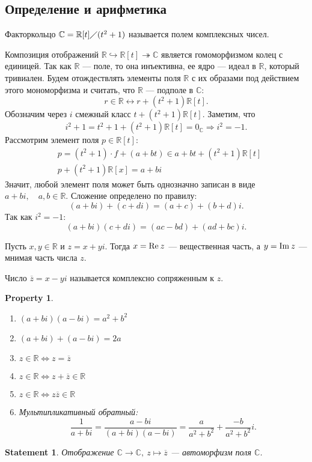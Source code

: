\documentclass[11pt]{book}
\newcommand{\R}{\mathbb{R}}
\newcommand{\Cm}{\mathbb{C}}
\newcommand{\po}{\diagup}
\newcommand{\re}{{\mathop{\text{\rm Re}}\:}}
\newcommand{\im}{{\mathop{\text{\rm Im}}}\:}
\theoremstyle{definition}
\theoremstyle{plain}
\theoremstyle{plain}
\newtheorem{st}{Statement}
\newtheorem*{prop}{Property}
\theoremstyle{definition}
\theoremstyle{remark}
\begin{document}
\subsection{Определение и арифметика}
\begin{defn}
    Факторкольцо $ \Cm = \R[t] \po (t^2+1)$ называется {\sf полем комплексных чисел}.
\end{defn}
Композиция отображений $ \R \hookrightarrow \R[t] \twoheadrightarrow \Cm$ является гомоморфизмом колец с единицей.
Так как $ \R$ --- поле, то она инъективна, ее ядро --- идеал в  $ \R$, который тривиален.
Будем отождествлять элементы поля $ \R$ с их образами под действием этого мономорфизма и считать, что  $ \R$ --- подполе  в $ \Cm$:
\[
    r \in \R \longleftrightarrow r + (t^2+1) \R[t]
.\]
Обозначим через $ i$ смежный класс  $ t + (t^2+1)\R[t]$. Заметим, что
\[
    i^2+1 = t^2+1 + (t^2+1)\R[t] = 0_{\Cm} \Longrightarrow i^2 = -1
.\]
Рассмотрим элемент поля $ p \in \R[t]$:
\begin{align*}
    &p = (t^2+1) \cdot f + (a+bt) \in a + bt + (t^2+1) \R[t] \\
    &p + (t^2+1) \R[x] = a + bi
\end{align*}
Значит, любой элемент поля может быть однозначно записан в виде $ a + bi, \quad a, b \in \R$.
Сложение определено по правилу:
$$
(a+bi)+(c+di) = (a+c) + (b+d) i
.$$
Так как $ i^2 = -1$:
\[
    (a+bi)(c + di) = (ac -bd)+(ad + bc)i
.\]
\begin{defn}
    Пусть $ x, y \in \R$ и $ z = x + yi$.
    Тогда  $ x = \re z$ ---  {\sf вещественная часть}, а $ y = \im z$ --- {\sf мнимая часть} числа  $ z$.

    Число $\overline{z}= x - yi $ называется {\sf комплексно сопряженным} к $ z$.
\end{defn}
\begin{prop}
    $ $
    \begin{enumerate}[noitemsep]
	\item $ (a+bi) (a-bi) = a^2  + b^2$
	\item $ (a+bi)+(a-bi) = 2a$
	\item $ z \in \R \Longleftrightarrow  z=\overline{z}$
	\item $ z \in \R \Longleftrightarrow  z +\overline{z} \in \R$
	\item $ z \in \R \Longleftrightarrow  z \overline{z} \in \R$
	\item Мультипликативный обратный:
	    \[
		\frac{1}{a + bi} = \frac{a-bi}{(a+bi)(a-bi)} = \frac{a}{a^2+b^2} + \frac{-b}{a^2+b^2}i
	    .\]
    \end{enumerate}
\end{prop}
\begin{st}
    Отображение $ \Cm \to  \Cm, ~ z \mapsto \overline{z}$ --- автоморфизм поля $ \Cm$.
\end{st}
\end{document}
